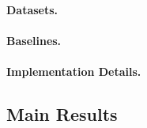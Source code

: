 \paragraph{Datasets.}

\paragraph{Baselines.}

\paragraph{Implementation Details.}

\subsection{Main Results}

